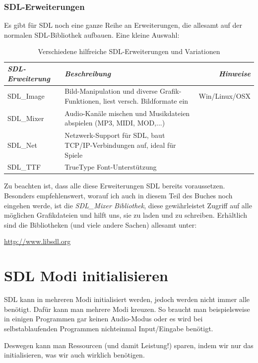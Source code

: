 \documentclass[b5paper,10pt,dvips,fleqn,titlepage,twoside]{book}
\begin{document}
\subsubsection{SDL-Erweiterungen}
Es gibt für SDL noch eine ganze Reihe an Erweiterungen, die allesamt auf der normalen SDL-Bibliothek aufbauen.
Eine kleine Auswahl:\\
\begin{table}[h]
\caption{Verschiedene hilfreiche SDL-Erweiterungen und Variationen}
\begin{tabular}{|l|p{2in}|r|}
\hline
\textbf{\emph{SDL-Erweiterung}} & \textbf{\emph{Beschreibung}} & \textbf{\emph{Hinweise}}\\\hline
SDL\_Image & Bild-Manipulation und diverse Grafik-Funktionen, liest versch. Bildformate ein& Win/Linux/OSX\\\hline
SDL\_Mixer & Audio-Kanäle mischen und Musikdateien abspielen (MP3, MIDI, MOD,...) & \\\hline
SDL\_Net & Netzwerk-Support für SDL, baut TCP/IP-Verbindungen auf, ideal für Spiele& \\\hline
SDL\_TTF & TrueType Font-Unterstützung & \\\hline
\end{tabular}
\end{table}


Zu beachten ist, dass alle diese Erweiterungen SDL bereits voraussetzen.
Besonders empfehlenswert, worauf ich auch in diesem Teil des Buches noch eingehen werde, ist die \emph{SDL\_Mixer Bibliothek}, diese gewährleistet Zugriff auf alle möglichen Grafikdateien und hilft uns, sie zu laden und zu schreiben.\newline
Erhältlich sind die Bibliotheken (und viele andere Sachen) allesamt unter:\newline

\url{http://www.libsdl.org}
\newpage
\section{SDL Modi initialisieren}

SDL kann in mehreren Modi initialisiert werden, jedoch werden nicht immer alle ben\"{o}tigt. Daf\"{u}r kann man mehrere Modi kreuzen. So braucht man beispielsweise in einigen Programmen gar keinen Audio-Modus oder es wird bei selbstablaufenden Programmen nichteinmal Input/Eingabe ben\"{o}tigt.

Deswegen kann man Ressourcen (und damit Leistung!) sparen, indem wir nur das initialisieren, was wir auch wirklich ben\"{o}tigen.
\end{document}
